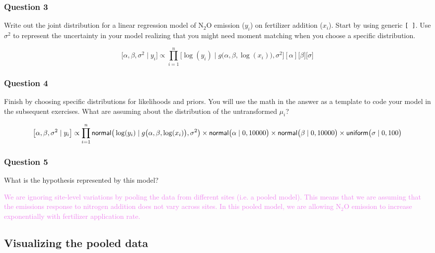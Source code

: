 \documentclass[
]{article}
\begin{document}
\hypertarget{question-3}{%
\subsubsection{Question 3}\label{question-3}}

Write out the joint distribution for a linear regression model of
\(\textrm{N} _2 \textrm{O}\) emission (\(y_{i}\)) on fertilizer addition
(\(x_{i}\)). Start by using generic \texttt{{[}\ {]}}. Use
\(\sigma^{2}\) to represent the uncertainty in your model realizing that
you might need moment matching when you choose a specific distribution.

\[
\bigl[ \alpha,\beta,\sigma^2 \mid y_i\bigr] \propto \prod_{i=1}^{n} \bigl[ \log(y_{i}) \mid g \bigl( \alpha, \beta, \log(x_i)  \bigr), \sigma^{2}\bigr][\alpha]\bigl[ \beta\bigr]\bigl[ \sigma \bigr]
\]

\hypertarget{question-4}{%
\subsubsection{Question 4}\label{question-4}}

Finish by choosing specific distributions for likelihoods and priors.
You will use the math in the answer as a template to code your model in
the subsequent exercises. What are assuming about the distribution of
the untransformed \(\mu_i\)?

\[
\bigl[ \alpha,\beta,\sigma^2 \mid y_i\bigr] \propto \prod_{i=1}^{n} {\sf normal} \bigr( \log(y_{i}) \mid g \bigl( \alpha, \beta, \log(x_i)  \bigr), \sigma^{2}\bigr) \times {\sf normal} \bigr(\alpha \mid 0,10000\bigr)  \times {\sf normal} \bigr(\beta \mid 0,10000\bigr) \times {\sf uniform}\bigr(\sigma \mid 0, 100 \bigl)
\]

\hypertarget{question-5}{%
\subsubsection{Question 5}\label{question-5}}

What is the hypothesis represented by this model?

\textcolor{violet}{We are ignoring site-level variations by pooling the data from different sites (i.e. a pooled model). This means that we are assuming that the emissions response to nitrogen addition does not vary across sites. In this pooled model, we are allowing $\textrm{N} _2 \textrm{O}$ emission to increase exponentially with fertilizer application rate.}

\hypertarget{visualizing-the-pooled-data}{%
\subsection{Visualizing the pooled
data}\label{visualizing-the-pooled-data}}
\end{document}
